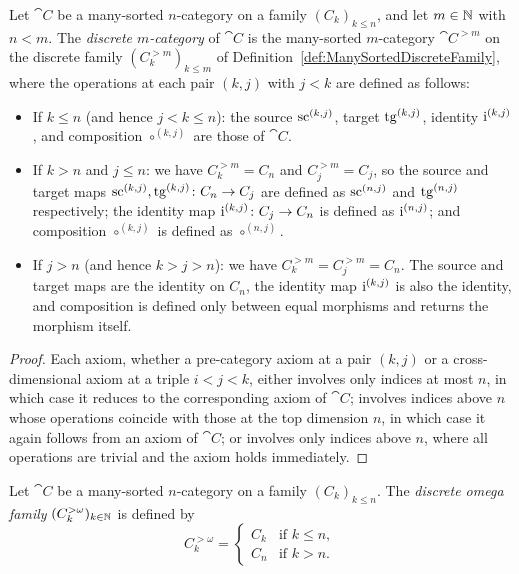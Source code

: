 \begin{construction}
  \label{def:ManySortedNCategory_discrete}
  \leanok
  Let $\cat{C}$ be a many-sorted $n$-category on a family $(C_k)_{k \leq n}$, and let $m \in \mathbb{N}$
  with $n < m$. The \emph{discrete $m$-category} of $\cat{C}$ is the many-sorted $m$-category
  $\cat{C}^{>m}$ on the discrete family $(C^{>m}_k)_{k \leq m}$ of
  Definition~\ref{def:ManySortedDiscreteFamily}, where the operations at each pair $(k, j)$ with $j
  < k$ are defined as follows:

  \begin{itemize}
    \item If $k \leq n$ (and hence $j < k \leq n$): the source $\operatorname{sc}^{(k,j)}$, target $\operatorname{tg}^{(k,j)}$,
      identity $\operatorname{i}^{(k,j)}$, and composition $\circ^{(k,j)}$ are those of $\cat{C}$.
    \item If $k > n$ and $j \leq n$: we have $C^{>m}_k = C_n$ and $C^{>m}_j = C_j$, so the source
      and target maps $\operatorname{sc}^{(k,j)}, \operatorname{tg}^{(k,j)} \colon C_n \to C_j$ are defined as $\operatorname{sc}^{(n,j)}$ and
      $\operatorname{tg}^{(n,j)}$ respectively; the identity map $\operatorname{i}^{(k,j)} \colon C_j \to C_n$ is defined as
      $\operatorname{i}^{(n,j)}$; and composition $\circ^{(k,j)}$ is defined as $\circ^{(n,j)}$.
    \item If $j > n$ (and hence $k > j > n$): we have $C^{>m}_k = C^{>m}_j = C_n$. The source and
      target maps are the identity on $C_n$, the identity map $\operatorname{i}^{(k,j)}$ is also the identity,
      and composition is defined only between equal morphisms and returns the morphism itself.
  \end{itemize}
\end{construction}

\begin{proof}
  \leanok
  Each axiom, whether a pre-category axiom at a pair $(k, j)$ or a cross-dimensional axiom at a
  triple $i < j < k$, either involves only indices at most $n$, in which case it reduces to the
  corresponding axiom of $\cat{C}$; involves indices above $n$ whose operations coincide with those
  at the top dimension $n$, in which case it again follows from an axiom of $\cat{C}$; or involves
  only indices above $n$, where all operations are trivial and the axiom holds immediately.
\end{proof}

\begin{definition}
  \label{def:ManySortedDiscreteOmegaFamily}
  \leanok
  Let $\cat{C}$ be a many-sorted $n$-category on a family $(C_k)_{k \leq n}$. The \emph{discrete
  omega family} $(C^{>\omega}_k)_{k \in \mathbb{N}}$ is defined by
  \[
    C^{>\omega}_k =
    \begin{cases}
      C_k & \text{if } k \leq n, \\
      C_n & \text{if } k > n.
    \end{cases}
  \]
\end{definition}

